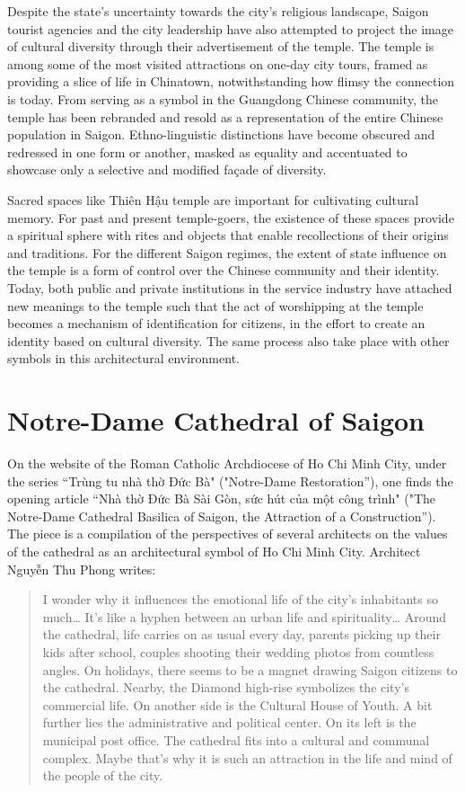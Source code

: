 Despite the state's uncertainty towards the city's religious landscape, Saigon tourist agencies and the city leadership have also attempted to project the image of cultural diversity through their advertisement of the temple. The temple is among some of the most visited attractions on one-day city tours, framed as providing a slice of life in Chinatown, notwithstanding how flimsy the connection is today.  From serving as a symbol in the Guangdong Chinese community, the temple has been rebranded and resold as a representation of the entire Chinese population in Saigon. Ethno-linguistic distinctions have become obscured and redressed in one form or another,  masked as equality and accentuated to showcase only a selective and modified façade of diversity.

Sacred spaces like Thiên Hậu temple are important for cultivating cultural memory. For past and present temple-goers, the existence of these spaces provide a spiritual sphere with rites and objects that enable recollections of their origins and traditions. For the different Saigon regimes, the extent of state influence on the temple is a form of control over the Chinese community and their identity. Today, both public and private institutions in the service industry have attached new meanings to the temple such that the act of worshipping at the temple becomes a mechanism of identification for citizens, in the effort to create an identity based on cultural diversity. The same process also take place with other symbols in this architectural environment.

\section{Notre-Dame Cathedral of Saigon}

On the website of the Roman Catholic Archdiocese of Ho Chi Minh City, under the series “Trùng tu nhà thờ Đức Bà" ("Notre-Dame Restoration”), one finds the opening article “Nhà thờ Đức Bà Sài Gòn, sức hút của một công trình" ("The Notre-Dame Cathedral Basilica of Saigon, the Attraction of a Construction”). The piece is a compilation of the perspectives of several architects on the values of the cathedral as an architectural symbol of Ho Chi Minh City. Architect Nguyễn Thu Phong writes:

\begin{quotation}
I wonder why it influences the emotional life of the city’s inhabitants so much… It’s like a hyphen between an urban life and spirituality… Around the cathedral, life carries on as usual every day, parents picking up their kids after school, couples shooting their wedding photos from countless angles. On holidays, there seems to be a magnet drawing Saigon citizens to the cathedral. Nearby, the Diamond high-rise symbolizes the city’s commercial life. On another side is the Cultural House of Youth. A bit further lies the administrative and political center. On its left is the municipal post office. The cathedral fits into a cultural and communal complex. Maybe that’s why it is such an attraction in the life and mind of the people of the city.
\end{quotation}

